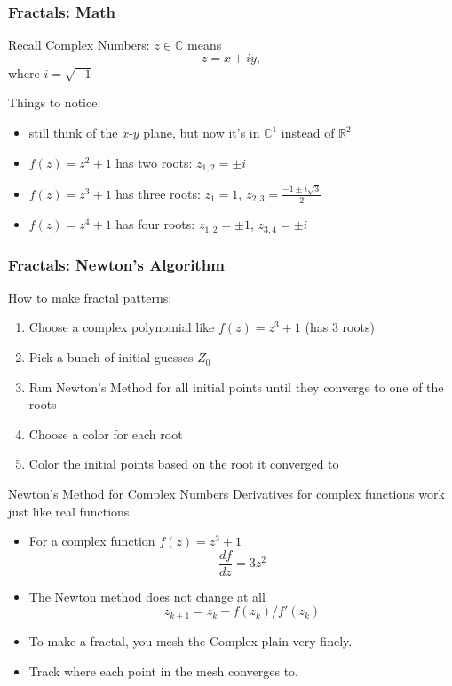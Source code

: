 \documentclass[10pt]{beamer}
\begin{document}
\begin{frame}
\frametitle{Fractals: Math}
Recall Complex Numbers: $z \in \mathbb{C}$ means
\begin{equation*}
  z = x + i y,
\end{equation*}
where $i = \sqrt{-1}$
\vspace{0.5cm}

Things to notice:
\begin{itemize}
  \item still think of the $x$-$y$ plane, but now it's in $\mathbb{C}^1$
  instead of $\mathbb{R}^2$
  \item $f(z) = z^2 + 1$ has two roots: $z_{1,2} = \pm i$
  \item $f(z) = z^3 + 1$ has three roots: $z_{1} = 1$, $z_{2,3}=\frac{-1\pm i \sqrt{3}}{2}$
  \item $f(z) = z^4 + 1$ has four roots: $z_{1,2} = \pm1$, $z_{3,4}=\pm i$
\end{itemize}
\end{frame}
\begin{frame}
\frametitle{Fractals: Newton's Algorithm}
How to make fractal patterns:
\begin{enumerate}
  \item Choose a complex polynomial like $f(z) = z^3 + 1$ (has 3 roots)
  \item Pick a bunch of initial guesses $Z_0$ 
  \item Run Newton's Method for all initial points until they converge to one of the roots
  \item Choose a color for each root
  \item Color the initial points based on the root it converged to
\end{enumerate}
\begin{center}
\end{center}
\end{frame}

\begin{frame}{Newton's Method for Complex Numbers}
    Derivatives for complex functions work just like real functions
    \begin{itemize}
        \item For a complex function $f(z) = z^3 + 1$
            $$ \frac{df}{dz} = 3z^2$$
        \item The Newton method does not change at all 
            $$z_{k+1} = z_{k} - f(z_k)/f'(z_k) $$
        \item To make a fractal, you mesh the Complex plain very finely. 
        \item Track where each point in the mesh converges to.
    \end{itemize}
\end{frame}
\end{document}
